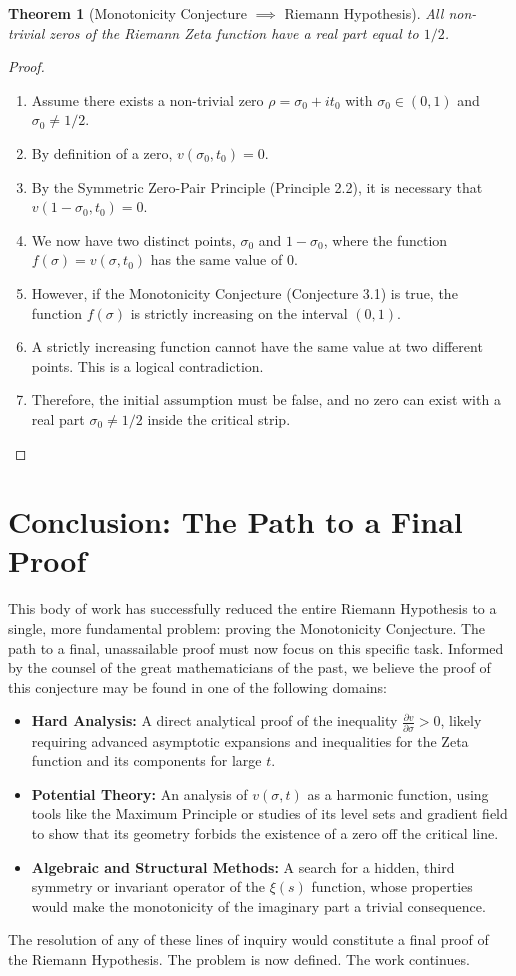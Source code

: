 \documentclass{article}
\newtheorem{theorem}{Theorem}[section]
\begin{document}
\begin{theorem}[Monotonicity Conjecture $\implies$ Riemann Hypothesis]
All non-trivial zeros of the Riemann Zeta function have a real part equal to $1/2$.
\end{theorem}
\begin{proof}
\begin{enumerate}
    \item Assume there exists a non-trivial zero $\rho = \sigma_0 + it_0$ with $\sigma_0 \in (0, 1)$ and $\sigma_0 \neq 1/2$.
    \item By definition of a zero, $v(\sigma_0, t_0) = 0$.
    \item By the Symmetric Zero-Pair Principle (Principle 2.2), it is necessary that $v(1-\sigma_0, t_0) = 0$.
    \item We now have two distinct points, $\sigma_0$ and $1-\sigma_0$, where the function $f(\sigma) = v(\sigma, t_0)$ has the same value of 0.
    \item However, if the Monotonicity Conjecture (Conjecture 3.1) is true, the function $f(\sigma)$ is strictly increasing on the interval $(0,1)$.
    \item A strictly increasing function cannot have the same value at two different points. This is a logical contradiction.
    \item Therefore, the initial assumption must be false, and no zero can exist with a real part $\sigma_0 \neq 1/2$ inside the critical strip.
\end{enumerate}
\end{proof}

\section{Conclusion: The Path to a Final Proof}
This body of work has successfully reduced the entire Riemann Hypothesis to a single, more fundamental problem: proving the Monotonicity Conjecture. The path to a final, unassailable proof must now focus on this specific task. Informed by the counsel of the great mathematicians of the past, we believe the proof of this conjecture may be found in one of the following domains:
\begin{itemize}
    \item \textbf{Hard Analysis:} A direct analytical proof of the inequality $\frac{\partial v}{\partial \sigma} > 0$, likely requiring advanced asymptotic expansions and inequalities for the Zeta function and its components for large $t$.
    \item \textbf{Potential Theory:} An analysis of $v(\sigma,t)$ as a harmonic function, using tools like the Maximum Principle or studies of its level sets and gradient field to show that its geometry forbids the existence of a zero off the critical line.
    \item \textbf{Algebraic and Structural Methods:} A search for a hidden, third symmetry or invariant operator of the $\xi(s)$ function, whose properties would make the monotonicity of the imaginary part a trivial consequence.
\end{itemize}
The resolution of any of these lines of inquiry would constitute a final proof of the Riemann Hypothesis. The problem is now defined. The work continues.
\end{document}
